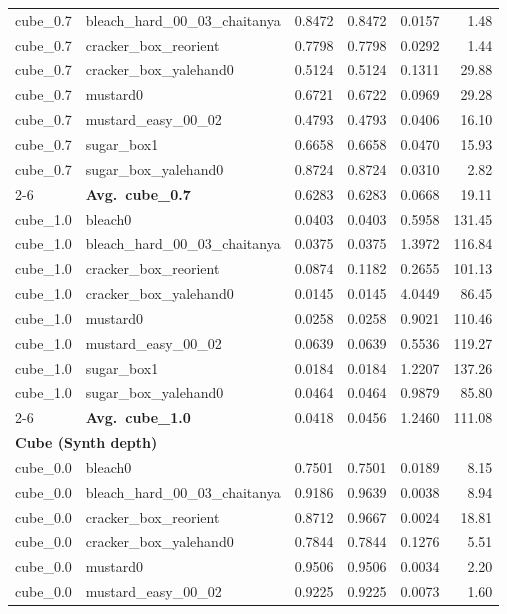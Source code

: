 \begin{longtable}{llrrrr}
  cube_0.7 & bleach\_hard\_00\_03\_chaitanya & 0.8472 & 0.8472 & 0.0157 & 1.48 \\
  cube_0.7 & cracker\_box\_reorient & 0.7798 & 0.7798 & 0.0292 & 1.44 \\
  cube_0.7 & cracker\_box\_yalehand0 & 0.5124 & 0.5124 & 0.1311 & 29.88 \\
  cube_0.7 & mustard0 & 0.6721 & 0.6722 & 0.0969 & 29.28 \\
  cube_0.7 & mustard\_easy\_00\_02 & 0.4793 & 0.4793 & 0.0406 & 16.10 \\
  cube_0.7 & sugar\_box1 & 0.6658 & 0.6658 & 0.0470 & 15.93 \\
  cube_0.7 & sugar\_box\_yalehand0 & 0.8724 & 0.8724 & 0.0310 & 2.82 \\
  \cmidrule{2-6}
  & \textbf{Avg.~cube_0.7} & 0.6283 & 0.6283 & 0.0668 & 19.11 \\
  \midrule
  cube_1.0 & bleach0 & 0.0403 & 0.0403 & 0.5958 & 131.45 \\
  cube_1.0 & bleach\_hard\_00\_03\_chaitanya & 0.0375 & 0.0375 & 1.3972 & 116.84 \\
  cube_1.0 & cracker\_box\_reorient & 0.0874 & 0.1182 & 0.2655 & 101.13 \\
  cube_1.0 & cracker\_box\_yalehand0 & 0.0145 & 0.0145 & 4.0449 & 86.45 \\
  cube_1.0 & mustard0 & 0.0258 & 0.0258 & 0.9021 & 110.46 \\
  cube_1.0 & mustard\_easy\_00\_02 & 0.0639 & 0.0639 & 0.5536 & 119.27 \\
  cube_1.0 & sugar\_box1 & 0.0184 & 0.0184 & 1.2207 & 137.26 \\
  cube_1.0 & sugar\_box\_yalehand0 & 0.0464 & 0.0464 & 0.9879 & 85.80 \\
  \cmidrule{2-6}
  & \textbf{Avg.~cube_1.0} & 0.0418 & 0.0456 & 1.2460 & 111.08 \\
  \midrule
\multicolumn{6}{l}{\textbf{Cube (Synth depth)}} \\
\midrule
  cube_0.0 & bleach0 & 0.7501 & 0.7501 & 0.0189 & 8.15 \\
  cube_0.0 & bleach\_hard\_00\_03\_chaitanya & 0.9186 & 0.9639 & 0.0038 & 8.94 \\
  cube_0.0 & cracker\_box\_reorient & 0.8712 & 0.9667 & 0.0024 & 18.81 \\
  cube_0.0 & cracker\_box\_yalehand0 & 0.7844 & 0.7844 & 0.1276 & 5.51 \\
  cube_0.0 & mustard0 & 0.9506 & 0.9506 & 0.0034 & 2.20 \\
  cube_0.0 & mustard\_easy\_00\_02 & 0.9225 & 0.9225 & 0.0073 & 1.60 \\

\end{longtable}
